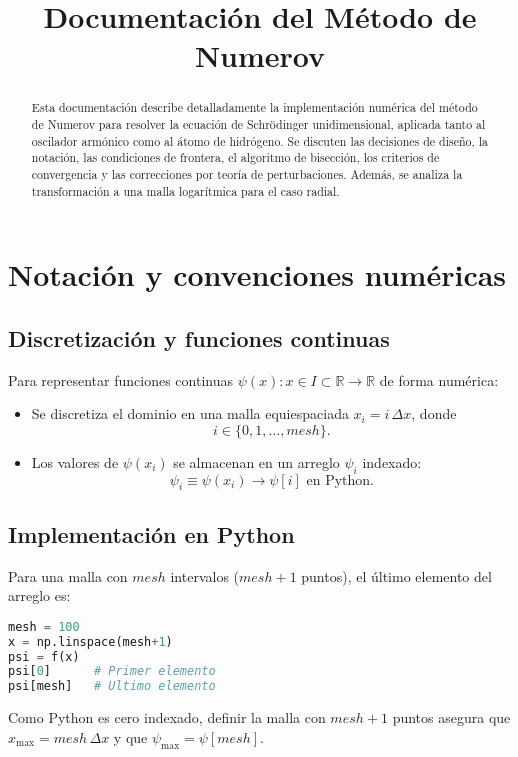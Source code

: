 \documentclass[11pt]{article}
\title{Documentación del Método de Numerov}
\date{}
\begin{document}
\maketitle

\begin{abstract}
Esta documentación describe detalladamente la implementación numérica del método de Numerov 
para resolver la ecuación de Schrödinger unidimensional, aplicada tanto al oscilador armónico 
como al átomo de hidrógeno. Se discuten las decisiones de diseño, la notación, las condiciones 
de frontera, el algoritmo de bisección, los criterios de convergencia y las correcciones por 
teoría de perturbaciones. Además, se analiza la transformación a una malla logarítmica para el 
caso radial.
\end{abstract}

\section{Notación y convenciones numéricas}
\label{sec:notation}

\subsection{Discretización y funciones continuas}
Para representar funciones continuas \(\psi(x) : x\in I \subset \mathbb{R} \to \mathbb{R}\) de forma numérica:

\begin{itemize}
\item Se discretiza el dominio en una malla equiespaciada \(x_i = i\,\Delta x\), donde
\[ i \in \{0,1,\ldots,mesh\}. \]
\item Los valores de \(\psi(x_i)\) se almacenan en un arreglo \(\psi_i\) indexado:
\[ \psi_i \equiv \psi(x_i) \to \psi[i] \text{ en Python}. \]
\end{itemize}

\subsection{Implementación en Python}
Para una malla con \(mesh\) intervalos (\(mesh + 1\) puntos), el último elemento del arreglo es:

\begin{lstlisting}[language=Python]
mesh = 100
x = np.linspace(mesh+1)
psi = f(x)
psi[0]      # Primer elemento
psi[mesh]   # Ultimo elemento
\end{lstlisting}

Como Python es cero indexado, definir la malla con \(mesh + 1\) puntos asegura que 
\(x_{\text{max}} = mesh \,\Delta x\) y que \(\psi_{\text{max}} = \psi[mesh]\).
\end{document}
